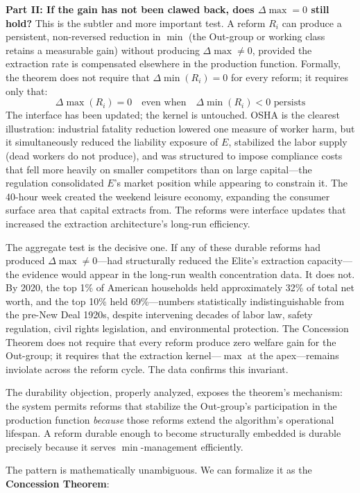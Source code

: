 \textbf{Part II: If the gain has not been clawed back, does $\Delta\max = 0$ still hold?} This is the subtler and more important test. A reform $R_i$ can produce a persistent, non-reversed reduction in $\min$ (the Out-group or working class retains a measurable gain) without producing $\Delta\max \neq 0$, provided the extraction rate is compensated elsewhere in the production function. Formally, the theorem does not require that $\Delta\min(R_i) = 0$ for every reform; it requires only that:
\[
\Delta\max(R_i) = 0 \quad \text{even when} \quad \Delta\min(R_i) < 0 \text{ persists}
\]
The interface has been updated; the kernel is untouched. OSHA is the clearest illustration: industrial fatality reduction lowered one measure of worker harm, but it simultaneously reduced the liability exposure of $E$, stabilized the labor supply (dead workers do not produce), and was structured to impose compliance costs that fell more heavily on smaller competitors than on large capital---the regulation consolidated $E$'s market position while appearing to constrain it. The 40-hour week created the weekend leisure economy, expanding the consumer surface area that capital extracts from. The reforms were interface updates that increased the extraction architecture's long-run efficiency.

The aggregate test is the decisive one. If any of these durable reforms had produced $\Delta\max \neq 0$---had structurally reduced the Elite's extraction capacity---the evidence would appear in the long-run wealth concentration data. It does not. By 2020, the top 1\% of American households held approximately 32\% of total net worth, and the top 10\% held 69\%---numbers statistically indistinguishable from the pre-New Deal 1920s, despite intervening decades of labor law, safety regulation, civil rights legislation, and environmental protection. The Concession Theorem does not require that every reform produce zero welfare gain for the Out-group; it requires that the extraction kernel---$\max$ at the apex---remains inviolate across the reform cycle. The data confirms this invariant.

The durability objection, properly analyzed, exposes the theorem's mechanism: the system permits reforms that stabilize the Out-group's participation in the production function \textit{because} those reforms extend the algorithm's operational lifespan. A reform durable enough to become structurally embedded is durable precisely because it serves $\min$-management efficiently.

The pattern is mathematically unambiguous. We can formalize it as the \textbf{Concession Theorem}:

